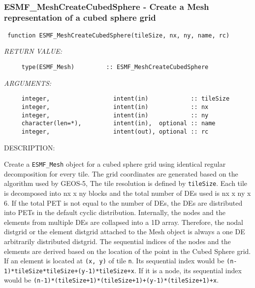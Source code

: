  
\mbox{}\hrulefill\ 
 

 \subsubsection [ESMF\_MeshCreateCubedSphere] {ESMF\_MeshCreateCubedSphere - Create a Mesh representation of a cubed sphere grid}


  
\begin{verbatim} function ESMF_MeshCreateCubedSphere(tileSize, nx, ny, name, rc)
 \end{verbatim}{\em RETURN VALUE:}
\begin{verbatim}     type(ESMF_Mesh)         :: ESMF_MeshCreateCubedSphere
 \end{verbatim}{\em ARGUMENTS:}
\begin{verbatim}     integer,                  intent(in)            :: tileSize
     integer,                  intent(in)            :: nx
     integer,                  intent(in)            :: ny
     character(len=*),         intent(in),  optional :: name
     integer,                  intent(out), optional :: rc
 \end{verbatim}
{\sf DESCRIPTION:\\ }


     Create a {\tt ESMF\_Mesh} object for a cubed sphere grid using identical regular decomposition for every tile.
     The grid coordinates are generated based on the algorithm used by GEOS-5, The tile resolution is defined by
     {\tt tileSize}.  Each tile is decomposed into nx x ny blocks and the total number of DEs used
     is nx x ny x 6.  If the total PET is not equal to the number of DEs, the DEs are distributed
     into PETs in the default cyclic distribution.  Internally, the nodes and the elements from multiple DEs are
     collapsed into a 1D array.  Therefore, the nodal distgrid or the element distgrid attached to the Mesh object
     is always a one DE arbitrarily distributed distgrid.  The sequential indices of the nodes and the elements
     are derived based on the location of the point in the Cubed Sphere grid.  If an element is located at {\tt (x, y)} of
     tile {\tt n}.  Its sequential index would be {\tt (n-1)*tileSize*tileSize+(y-1)*tileSize+x}.  If it is a node, its
     sequential index would be {\tt (n-1)*(tileSize+1)*(tileSize+1)+(y-1)*(tileSize+1)+x}.
 
